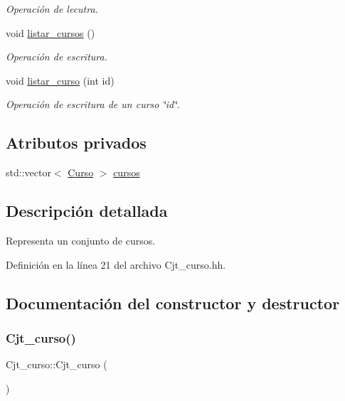 \begin{DoxyCompactItemize}
\begin{DoxyCompactList}\small\item\em Operación de lecutra. \end{DoxyCompactList}\item 
void \mbox{\hyperlink{class_cjt__curso_a2a1a2f9d0f54afaf5239b661f0d74164}{listar\+\_\+cursos}} ()
\begin{DoxyCompactList}\small\item\em Operación de escritura. \end{DoxyCompactList}\item 
void \mbox{\hyperlink{class_cjt__curso_a8757e2e3a01006da2a553e9fbf119fd9}{listar\+\_\+curso}} (int id)
\begin{DoxyCompactList}\small\item\em Operación de escritura de un curso \char`\"{}id\char`\"{}. \end{DoxyCompactList}\end{DoxyCompactItemize}
\subsection*{Atributos privados}
\begin{DoxyCompactItemize}
\item 
std\+::vector$<$ \mbox{\hyperlink{class_curso}{Curso}} $>$ \mbox{\hyperlink{class_cjt__curso_af8d4def315cf56b9aab3328bf80bb32c}{cursos}}
\end{DoxyCompactItemize}


\subsection{Descripción detallada}
Representa un conjunto de cursos. 

Definición en la línea 21 del archivo Cjt\+\_\+curso.\+hh.



\subsection{Documentación del constructor y destructor}
\mbox{\label{class_cjt__curso_ab19c9d9a6f98d893563fba7b38fe8cbb}} 
\subsubsection{\texorpdfstring{Cjt\+\_\+curso()}{Cjt\_curso()}}
{\footnotesize\ttfamily Cjt\+\_\+curso\+::\+Cjt\+\_\+curso (\begin{DoxyParamCaption}{ }\end{DoxyParamCaption})}



